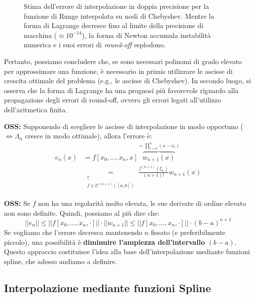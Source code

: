 \begin{figure}[htbp]
    
    \caption{Stima dell'errore di interpolazione in doppia precisione per la funzione di Runge interpolata su nodi di Chebyshev. Mentre la forma di Lagrange decresce fino al limite della precisione di macchina ($\approx 10^{-14}$), la forma di Newton accumula instabilità numerica e i suoi errori di \textit{round-off} esplodono.}
\end{figure}

Pertanto, possiamo concludere che, se sono necessari polinomi di grado elevato per approssimare una funzione, è necessario in primis utilizzare le ascisse di crescita ottimale del problema (e.g., le ascisse di Chebyshev). In secondo luogo, si osserva che la forma di Lagrange ha una prognosi più favorevole riguardo alla propagazione degli errori di round-off, ovvero gli errori legati all'utilizzo dell'aritmetica finita.

\newpage
\textbf{OSS:} Supponendo di scegliere le ascisse di interpolazione in modo opportuno ($\iff \Lambda_n$ cresce in modo ottimale), allora l'errore è:
\begin{align*}
    e_n(x) &= f[x_0, \dots, x_n, x] \overbrace{w_{n+1}(x)}^{= \prod_{i=0}^{n} (x - x_i)} \\
    &\underset{\substack{\uparrow \\ f \in \mathcal{C}^{(n+1)}([a,b])}}{=} \frac{f^{(n+1)}(\xi_x)}{(n+1)!} w_{n+1}(x)
\end{align*}

\textbf{OSS:} Se $f$ non ha una regolarità molto elevata, le sue derivate di ordine elevato non sono definite. Quindi, possiamo al più dire che:
$$||e_n|| \le ||f[x_0, \dots, x_n, \cdot]|| \cdot ||w_{n+1}|| \le ||f[x_0, \dots, x_n, \cdot]|| \cdot (b-a)^{n+1}$$
Se vogliamo che l'errore decresca mantenendo $n$ fissato (e preferibilmente piccolo), una possibilità è \textbf{diminuire l'ampiezza dell'intervallo $(b-a)$}. 
Questo approccio costituisce l'idea alla base dell'interpolazione mediante funzioni spline, che adesso andiamo a definire.

\vspace{0.6cm}
\subsection{Interpolazione mediante funzioni Spline}


